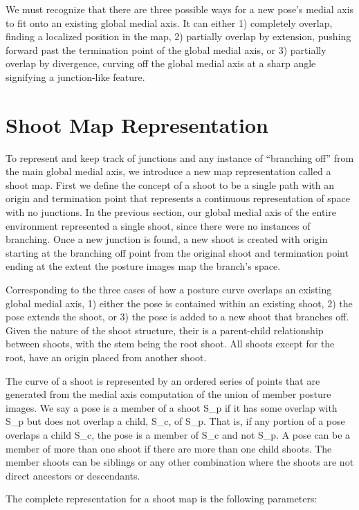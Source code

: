 We must recognize that there are three possible ways for a new pose’s medial axis to fit onto an existing global medial axis. It can either 1) completely overlap, finding a localized position in the map, 2) partially overlap by extension, pushing forward past the termination point of the global medial axis, or 3) partially overlap by divergence, curving off the global medial axis at a sharp angle signifying a junction-like feature.

\section{Shoot Map Representation}
\label{shootmaprepresentation}

To represent and keep track of junctions and any instance of “branching off” from the main global medial axis, we introduce a new map representation called a shoot map. First we define the concept of a shoot to be a single path with an origin and termination point that represents a continuous representation of space with no junctions. In the previous section, our global medial axis of the entire environment represented a single shoot, since there were no instances of branching. Once a new junction is found, a new shoot is created with origin starting at the branching off point from the original shoot and termination point ending at the extent the posture images map the branch’s space. 

Corresponding to the three cases of how a posture curve overlaps an existing global medial axis, 1) either the pose is contained within an existing shoot, 2) the pose extends the shoot, or 3) the pose is added to a new shoot that branches off. Given the nature of the shoot structure, their is a parent-child relationship between shoots, with the stem being the root shoot. All shoots except for the root, have an origin placed from another shoot.

The curve of a shoot is represented by an ordered series of points that are generated from the medial axis computation of the union of member posture images. We say a pose is a member of a shoot S\_p if it has some overlap with S\_p but does not overlap a child, S\_c, of S\_p. That is, if any portion of a pose overlaps a child S\_c, the pose is a member of S\_c and not S\_p. A pose can be a member of more than one shoot if there are more than one child shoots. The member shoots can be siblings or any other combination where the shoots are not direct ancestors or descendants.

The complete representation for a shoot map is the following parameters:

